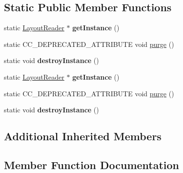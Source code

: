 \subsection*{Static Public Member Functions}
\begin{DoxyCompactItemize}
\item 
\mbox{\label{classcocostudio_1_1LayoutReader_a8a84356120a3bfbcb06627edbba33443}} 
static \hyperlink{classcocostudio_1_1LayoutReader}{Layout\+Reader} $\ast$ {\bfseries get\+Instance} ()
\item 
static C\+C\+\_\+\+D\+E\+P\+R\+E\+C\+A\+T\+E\+D\+\_\+\+A\+T\+T\+R\+I\+B\+U\+TE void \hyperlink{classcocostudio_1_1LayoutReader_ac1956c12637af4eb76d5c70f5b6ea857}{purge} ()
\item 
\mbox{\label{classcocostudio_1_1LayoutReader_a79b582842aedceddf277dd92d45065d1}} 
static void {\bfseries destroy\+Instance} ()
\item 
\mbox{\label{classcocostudio_1_1LayoutReader_aba27112274611c739d1688ec72efaac9}} 
static \hyperlink{classcocostudio_1_1LayoutReader}{Layout\+Reader} $\ast$ {\bfseries get\+Instance} ()
\item 
static C\+C\+\_\+\+D\+E\+P\+R\+E\+C\+A\+T\+E\+D\+\_\+\+A\+T\+T\+R\+I\+B\+U\+TE void \hyperlink{classcocostudio_1_1LayoutReader_ac1956c12637af4eb76d5c70f5b6ea857}{purge} ()
\item 
\mbox{\label{classcocostudio_1_1LayoutReader_a0891cb0013c830eb3685b79d74b9f6e9}} 
static void {\bfseries destroy\+Instance} ()
\end{DoxyCompactItemize}
\subsection*{Additional Inherited Members}


\subsection{Member Function Documentation}
\mbox{\label{classcocostudio_1_1LayoutReader_ac1956c12637af4eb76d5c70f5b6ea857}} 
